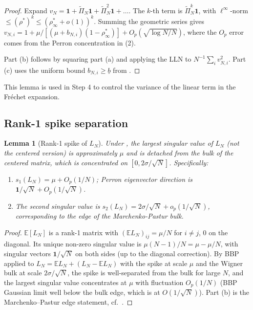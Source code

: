 \documentclass[11pt,a4paper]{article}
\newtheorem{lemma}[theorem]{Lemma}
\theoremstyle{definition}
\newcommand{\rhoStar}{\rho^\ast}
\newcommand{\rhoInf}{\rho_\infty^\ast}
\begin{document}
\begin{proof}
Expand $v_N = \mathbf 1 + \widetilde\Pi_N\mathbf 1 + \widetilde\Pi_N^2\mathbf 1 + \dots$.
The $k$-th term is $\widetilde\Pi_N^k\mathbf 1$, with $\ell^\infty$-norm
$\leq(\rhoStar)^k\leq(\rho_\infty^\ast + o(1))^k$. Summing the geometric series gives
$v_{N,i} = 1 + \mu/[(\mu+b_{N,i})(1 - \rhoInf)] + O_p(\sqrt{\log N/N})$,
where the $O_p$ error comes from the Perron concentration in (2).

Part (b) follows by squaring part (a) and applying the LLN to
$N^{-1}\sum_i v_{N,i}^2$. Part (c) uses the uniform bound
$b_{N,i}\geq\underline b$ from .
\end{proof}

This lemma is used in  Step 4 to control the variance of
the linear term in the Fr\'echet expansion.

\subsection{Rank-1 spike separation}

\begin{lemma}[Rank-1 spike of $L_N$]
\label{lem:spike}
Under , the largest singular value of $L_N$
(not the centered version) is approximately $\mu$ and is detached from the
bulk of the centered matrix, which is concentrated on $[0,2\sigma/\sqrt N]$.
Specifically:
\begin{enumerate}[label=(\alph*),leftmargin=1.5em]
\item $s_1(L_N) = \mu + O_p(1/N)$; Perron eigenvector direction is
   $\mathbf 1/\sqrt N + O_p(1/\sqrt N)$.
\item The second singular value is $s_2(L_N) = 2\sigma/\sqrt N + o_p(1/\sqrt N)$,
   corresponding to the edge of the Marchenko-Pastur bulk.
\end{enumerate}
\end{lemma}

\begin{proof}
$\mathbb E[L_N]$ is a rank-1 matrix with $(\mathbb E L_N)_{ij} = \mu/N$ for
$i\neq j$, $0$ on the diagonal. Its unique non-zero singular value is
$\mu(N-1)/N = \mu - \mu/N$, with singular vectors $\mathbf 1/\sqrt N$ on both
sides (up to the diagonal correction). By BBP
\cite{BenaychGeorgesNadakuditi2011} applied to
$L_N = \mathbb E L_N + (L_N - \mathbb E L_N)$ with the spike at scale $\mu$
and the Wigner bulk at scale $2\sigma/\sqrt N$, the spike is well-separated
from the bulk for large $N$, and the largest singular value concentrates at
$\mu$ with fluctuation $O_p(1/N)$ (BBP Gaussian limit well below the bulk
edge, which is at $O(1/\sqrt N)$). Part (b) is the Marchenko--Pastur edge
statement, cf.\ \cite[Theorem~3.16]{BaiSilverstein2010}.
\end{proof}
\end{document}
